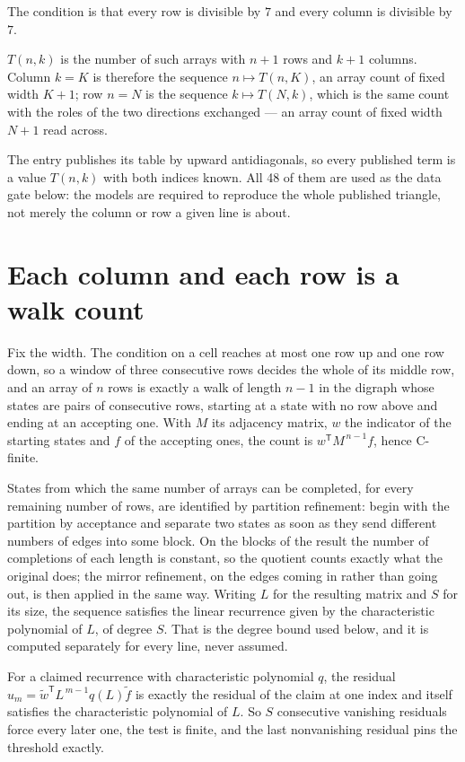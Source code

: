 \documentclass[11pt]{article}
\theoremstyle{definition}
\begin{document}
The condition is that every row is divisible by $7$ and every column is divisible by $7$.

$T(n,k)$ is the number of such arrays with $n + 1$ rows and $k + 1$ columns. Column $k = K$ is therefore the sequence $n \mapsto T(n,K)$, an array count of fixed width $K + 1$; row $n = N$ is the sequence $k \mapsto T(N,k)$, which is the same count with the roles of the two directions exchanged --- an array count of fixed width $N + 1$ read across.

The entry publishes its table by upward antidiagonals, so every published term is a value $T(n,k)$ with both indices known. All 48 of them are used as the data gate below: the models are required to reproduce the whole published triangle, not merely the column or row a given line is about.

\section{Each column and each row is a walk count}

Fix the width. The condition on a cell reaches at most one row up and one row down, so a window of three consecutive rows decides the whole of its middle row, and an array of $n$ rows is exactly a walk of length $n-1$ in the digraph whose states are pairs of consecutive rows, starting at a state with no row above and ending at an accepting one. With $M$ its adjacency matrix, $w$ the indicator of the starting states and $f$ of the accepting ones, the count is $w^{\mathsf T}M^{\,n-1}f$, hence C-finite.

States from which the same number of arrays can be completed, for every remaining number of rows, are identified by partition refinement: begin with the partition by acceptance and separate two states as soon as they send different numbers of edges into some block. On the blocks of the result the number of completions of each length is constant, so the quotient counts exactly what the original does; the mirror refinement, on the edges coming in rather than going out, is then applied in the same way. Writing $L$ for the resulting matrix and $S$ for its size, the sequence satisfies the linear recurrence given by the characteristic polynomial of $L$, of degree $S$. That is the degree bound used below, and it is computed separately for every line, never assumed.

For a claimed recurrence with characteristic polynomial $q$, the residual $u_m = \tilde w^{\mathsf T}L^{\,m-1}q(L)\tilde f$ is exactly the residual of the claim at one index and itself satisfies the characteristic polynomial of $L$. So $S$ consecutive vanishing residuals force every later one, the test is finite, and the last nonvanishing residual pins the threshold exactly.
\end{document}

